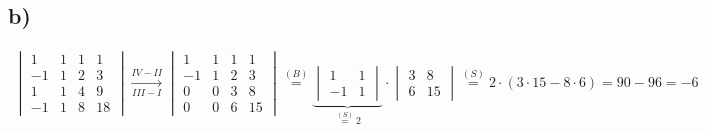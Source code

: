 \documentclass[titlepage]{article}
\newcommand{\1}{\mathbb{1}}
\newcommand{\0}{\mathbb{0}}
\newcommand{\detZ}[4]{\begin{vmatrix}#1&#2\\#3&#4\end{vmatrix}}
\begin{document}
		\subsection*{b)}
			\begin{align*}
				\begin{vmatrix}
					1&1&1&1\\
					-1&1&2&3\\
					1&1&4&9\\
					-1&1&8&18
				\end{vmatrix}
				\xrightarrow[III-I]{IV-II}
				\begin{vmatrix}
					1&1&1&1\\
					-1&1&2&3\\
					0&0&3&8\\
					0&0&6&15
				\end{vmatrix}
				\overset{(B)}{=}\underbrace{\detZ{1}{1}{-1}{1}}_{\overset{(S)}{=}2}\cdot\detZ{3}{8}{6}{15}\overset{(S)}{=}2\cdot(3\cdot15-8\cdot6)=90-96=-6
			\end{align*}
\end{document}
